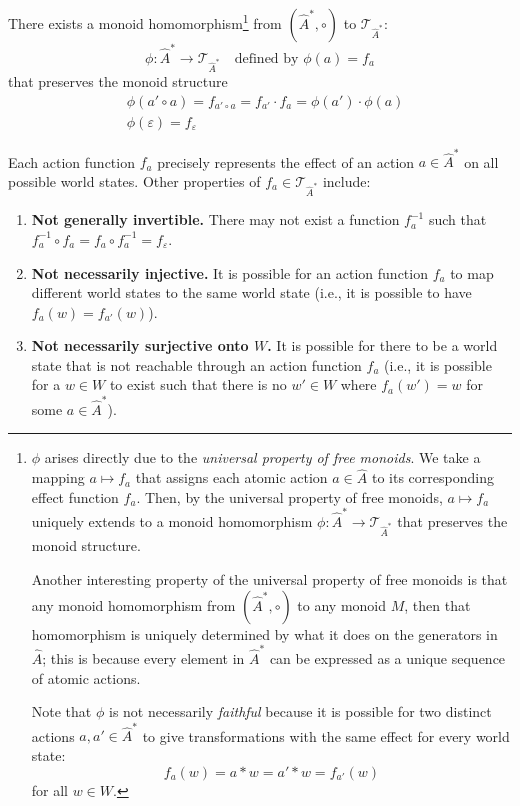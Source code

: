 There exists a monoid homomorphism\footnote{
    $\phi$ arises directly due to the \emph{universal property of free monoids}.
    We take a mapping $a \mapsto f_{a}$ that assigns each atomic action $a \in \hat{A}$ to its corresponding effect function $f_{a}$.
    Then, by the universal property of free monoids, $a \mapsto f_{a}$ uniquely extends to a monoid homomorphism $\phi : \hat{A}^{*} \to \mathcal{T}_{\hat{A}^{*}}$ that preserves the monoid structure.

    Another interesting property of the universal property of free monoids is that any monoid homomorphism from $(\hat{A}^{*}, \circ)$ to any monoid $M$, then that homomorphism is uniquely determined by what it does on the generators in $\hat{A}$;
    this is because every element in $\hat{A}^{*}$ can be expressed as a unique sequence of atomic actions.

    Note that $\phi$ is not necessarily \emph{faithful} because it is possible for two distinct actions $a, a' \in \hat{A}^{*}$ to give transformations with the same effect for every world state:
    \begin{equation}
        f_{a}(w) = a \ast w = a' \ast w = f_{a'}(w)
    \end{equation}
    for all $w \in W$.
} from $(\hat{A}^{*}, \circ)$ to $\mathcal{T}_{\hat{A}^{*}}$:
\begin{equation}
    \label{eqn:monoid_homomorphism_from_free_monoid_to_set_of_functions}
    \phi : \hat{A}^{*} \to \mathcal{T}_{\hat{A}^{*}} \quad\text{defined by $\phi(a) = f_{a}$}
\end{equation}
that preserves the monoid structure
\begin{align}
	 & \phi(a' \circ a) = f_{a' \circ a} = f_{a'} \cdot f_{a} = \phi(a') \cdot \phi(a) \\
	 & \phi(\varepsilon) = f_{\varepsilon}
\end{align}

Each action function $f_{a}$ precisely represents the effect of an action $a \in \hat{A}^{*}$ on all possible world states.
Other properties of $f_{a} \in \mathcal{T}_{\hat{A}^{*}}$ include:
\begin{enumerate}
    \item \textbf{Not generally invertible.}
    There may not exist a function $f_{a}^{-1}$ such that $f_{a}^{-1} \circ f_{a} = f_{a} \circ f_{a}^{-1} = f_{\varepsilon}$.
    \item \textbf{Not necessarily injective.}
    It is possible for an action function $f_{a}$ to map different world states to the same world state (i.e., it is possible to have $f_{a}(w) = f_{a'}(w)$).
    \item \textbf{Not necessarily surjective onto $W$.}
    It is possible for there to be a world state that is not reachable through an action function $f_{a}$ (i.e., it is possible for a $w \in W$ to exist such that there is no $w' \in W$ where $f_{a}(w') = w$ for some $a \in \hat{A}^{*}$).
\end{enumerate}

